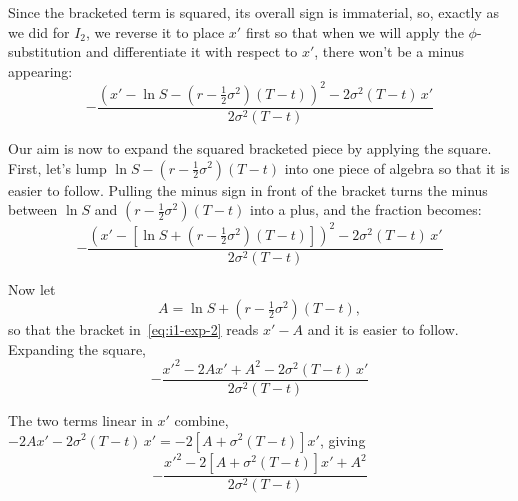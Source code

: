 \documentclass[a4paper,12pt]{article}
\numberwithin{equation}{section}
\begin{document}
Since the bracketed term is squared, its overall sign is immaterial, so, exactly
as we did for $I_2$, we reverse it to place $x'$ first so that when we will apply the $\phi$-substitution and differentiate it with respect to $x'$, there won't be a minus appearing:
\begin{equation}\label{eq:i1-exp-2}
    -\frac{\left(x' - \ln S - \left(r - \frac{1}{2}\sigma^2\right)(T-t)\right)^2 - 2\sigma^2(T-t)\,x'}{2\sigma^2(T-t)} 
\end{equation}

Our aim is now to expand the squared bracketed piece by applying the square. First, let's lump $\ln S - \left(r - \frac{1}{2}\sigma^2\right)(T-t)$ into one piece of algebra so that it is easier to follow. Pulling the minus sign in front of the bracket turns the minus between
$\ln S$ and $(r-\frac{1}{2}\sigma^2)(T-t)$ into a plus, and the fraction becomes:
\begin{equation}\label{eq:i1-exp-3}
    -\frac{\left(x' - \left[\ln S + \left(r - \frac{1}{2}\sigma^2\right)(T-t)\right]\right)^2 - 2\sigma^2(T-t)\,x'}{2\sigma^2(T-t)} 
\end{equation}

Now let
\[
  A = \ln S + \left(r - \tfrac{1}{2}\sigma^2\right)(T-t),
\]
so that the bracket in~\eqref{eq:i1-exp-2} reads $x' - A$ and it is easier to follow. Expanding the square,
\begin{equation}\label{eq:i1-exp-4}
  -\frac{{x'}^2 - 2Ax' + A^2 - 2\sigma^2(T-t)\,x'}{2\sigma^2(T-t)} 
\end{equation}

The two terms linear in $x'$ combine,
$-2Ax' - 2\sigma^2(T-t)\,x' = -2\left[A + \sigma^2(T-t)\right]x'$, giving
\begin{equation}\label{eq:i1-exp-5}
  -\frac{{x'}^2 - 2\left[A + \sigma^2(T-t)\right]x' + A^2}{2\sigma^2(T-t)} 
\end{equation}
\end{document}

